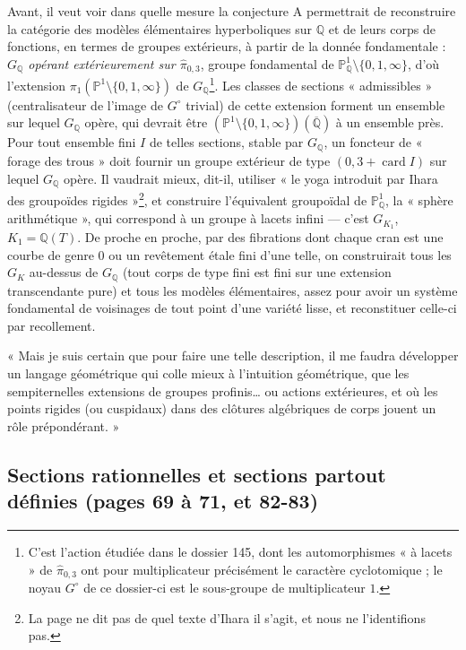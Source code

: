 \documentclass[11pt,a4paper]{article}
\begin{document}
Avant, il veut voir dans quelle mesure la conjecture A permettrait de
reconstruire la catégorie des modèles élémentaires hyperboliques sur
$\mathbb{Q}$ et de leurs corps de fonctions, en termes de groupes extérieurs,
à partir de la donnée fondamentale : \emph{$G_{\mathbb{Q}}$ opérant
extérieurement sur $\widehat{\pi}_{0,3}$}, groupe fondamental de
$\mathbb{P}^1_{\mathbb{Q}} \setminus \{0, 1, \infty\}$, d'où l'extension
$\pi_1(\mathbb{P}^1 \setminus \{0,1,\infty\})$ de $G_{\mathbb{Q}}$\footnote{C'est
l'action étudiée dans le dossier 145, dont les automorphismes « à lacets » de
$\widehat{\pi}_{0,3}$ ont pour multiplicateur précisément le caractère
cyclotomique ; le noyau $G^{\circ}$ de ce dossier-ci est le sous-groupe de
multiplicateur $1$.}. Les classes de sections « admissibles » (centralisateur
de l'image de $G^{\circ}$ trivial) de cette extension forment un ensemble sur
lequel $G_{\mathbb{Q}}$ opère, qui devrait être $(\mathbb{P}^1 \setminus
\{0,1,\infty\})(\overline{\mathbb{Q}})$ à un ensemble près. Pour tout ensemble
fini $I$ de telles sections, stable par $G_{\mathbb{Q}}$, un foncteur de
« forage des trous » doit fournir un groupe extérieur de type $(0, 3 +
\operatorname{card} I)$ sur lequel $G_{\mathbb{Q}}$ opère. Il vaudrait mieux,
dit-il, utiliser « le yoga introduit par Ihara des groupoïdes
rigides »\footnote{La page ne dit pas de quel texte d'Ihara il s'agit, et
nous ne l'identifions pas.}, et construire l'équivalent groupoïdal de
$\mathbb{P}^1_{\mathbb{Q}}$, la « sphère arithmétique », qui correspond à un
groupe à lacets infini — c'est $G_{K_1}$, $K_1 = \mathbb{Q}(T)$. De proche en
proche, par des fibrations dont chaque cran est une courbe de genre $0$ ou un
revêtement étale fini d'une telle, on construirait tous les $G_K$ au-dessus de
$G_{\mathbb{Q}}$ (tout corps de type fini est fini sur une extension
transcendante pure) et tous les modèles élémentaires, assez pour avoir un
système fondamental de voisinages de tout point d'une variété lisse, et
reconstituer celle-ci par recollement.

« Mais je suis certain que pour faire une telle description, il me faudra
développer un langage géométrique qui colle mieux à l'intuition géométrique,
que les sempiternelles extensions de groupes profinis… ou actions
extérieures, et où les points rigides (ou cuspidaux) dans des clôtures
algébriques de corps jouent un rôle prépondérant. »

\subsection*{Sections rationnelles et sections partout définies (pages 69 à 71, et 82-83)}
\end{document}
